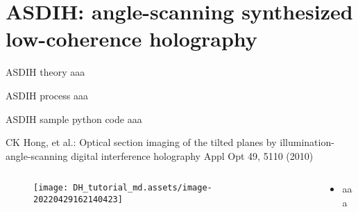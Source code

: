 \documentclass[t, aspectratio=169]{beamer}
\begin{document}


\section{ASDIH: angle-scanning synthesized low-coherence holography}
\begin{frame}[c]
	\centering\LARGE\textbf{\secname}
\end{frame}



\begin{frame}{ASDIH theory}
aaa
\end{frame}


\begin{frame}{ASDIH process}
aaa
\end{frame}


\begin{frame}{ASDIH sample python code}
aaa
\end{frame}


\begin{frame}{CK Hong, et al.: Optical section imaging of the tilted planes by illumination-angle-scanning digital interference holography}
	\vspace{-3 mm}
	\small Appl Opt 49, 5110 (2010)
	\begin{columns}
		\begin{column}{.6\textwidth}
			\begin{figure}
				\texttt{[image: DH\_tutorial\_md.assets/image-20220429162140423]}
			\end{figure}
		\end{column}
		\begin{column}{.4\textwidth}
			\begin{itemize}
				\item aaa
			\end{itemize}
		\end{column}
	\end{columns}
\end{frame}


\end{document}

